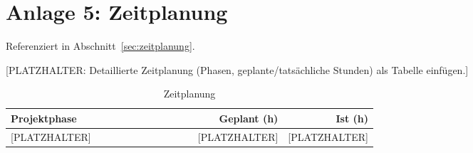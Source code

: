 \section*{Anlage 5: Zeitplanung}
\label{anh:zeitplanung}
Referenziert in Abschnitt~\ref{sec:zeitplanung}.

[PLATZHALTER: Detaillierte Zeitplanung (Phasen, geplante/tats\"achliche
Stunden) als Tabelle einf\"ugen.]

\begin{table}[h!]
  \centering
  \caption{Zeitplanung}
  \begin{tabular}{@{}p{0.6\linewidth}rr@{}}
    \toprule
    \textbf{Projektphase} & \textbf{Geplant (h)} & \textbf{Ist (h)} \\
    \midrule
    {[}PLATZHALTER{]} & {[}PLATZHALTER{]} & {[}PLATZHALTER{]} \\
    \bottomrule
  \end{tabular}
\end{table}
